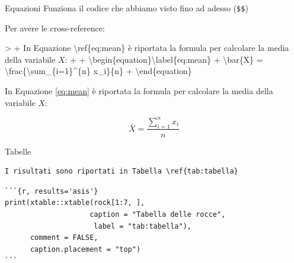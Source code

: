 \documentclass[
  ignorenonframetext,
]{beamer}
\newenvironment{Shaded}{}{}
\newcommand{\ExtensionTok}[1]{#1}
\newcommand{\KeywordTok}[1]{\textcolor[rgb]{0.00,0.00,1.00}{#1}}
\newcommand{\NormalTok}[1]{#1}
\newcommand{\SpecialCharTok}[1]{\textcolor[rgb]{0.00,0.50,0.50}{#1}}
\newcommand{\SpecialStringTok}[1]{\textcolor[rgb]{0.00,0.50,0.50}{#1}}
\begin{document}
\begin{frame}[fragile]{Equazioni}
\protect\hypertarget{equazioni}{}
Funziona il codice che abbiamo visto fino ad adesso (\texttt{\$\$})

Per avere le cross-reference:

\begin{Shaded}
\begin{Highlighting}[]
\NormalTok{\textgreater{} }
\NormalTok{+ In Equazione }\KeywordTok{\textbackslash{}ref}\NormalTok{\{}\ExtensionTok{eq:mean}\NormalTok{\} è riportata la formula per calcolare la media della variabile }\SpecialStringTok{$X$}\NormalTok{:}
\NormalTok{+ }
\NormalTok{+ }\KeywordTok{\textbackslash{}begin}\NormalTok{\{}\ExtensionTok{equation}\NormalTok{\}}\SpecialCharTok{\textbackslash{}label}\SpecialStringTok{\{eq:mean\}}
\SpecialStringTok{+   }\SpecialCharTok{\textbackslash{}bar}\SpecialStringTok{\{X\} = }\SpecialCharTok{\textbackslash{}frac}\SpecialStringTok{\{}\SpecialCharTok{\textbackslash{}sum}\SpecialStringTok{\_\{i=1\}\^{}\{n\} x\_i\}\{n\}}
\SpecialStringTok{+ }\KeywordTok{\textbackslash{}end}\NormalTok{\{}\ExtensionTok{equation}\NormalTok{\}}
\end{Highlighting}
\end{Shaded}

\pause

In Equazione \ref{eq:mean} è riportata la formula per calcolare la media
della variabile \(X\):

\begin{equation}\label{eq:mean}
    \bar{X} = \frac{\sum_{i=1}^{n} x_i}{n}
\end{equation}
\end{frame}

\begin{frame}[fragile]{Tabelle}
\protect\hypertarget{tabelle}{}
\begin{verbatim}
I risultati sono riportati in Tabella \ref{tab:tabella}
\end{verbatim}

\begin{verbatim}
```{r, results='asis'}
print(xtable::xtable(rock[1:7, ], 
                    caption = "Tabella delle rocce", 
                     label = "tab:tabella"), 
      comment = FALSE, 
      caption.placement = "top")
```
\end{verbatim}
\end{frame}
\end{document}

